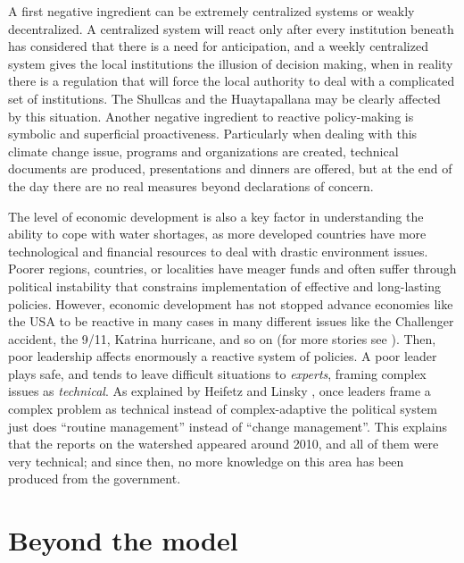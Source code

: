 \documentclass[doc,12pt,floatsintext]{apa7}
\begin{document}
A first negative ingredient can be extremely centralized systems or weakly decentralized. A centralized system will react only after every institution beneath has considered that there is a need for anticipation, and a weekly centralized system gives the local institutions the illusion of decision making, when in reality there is a regulation that will force the local authority to deal with a complicated set of institutions. The Shullcas and the Huaytapallana may be clearly affected by this situation. Another negative ingredient to reactive policy-making is symbolic and superficial proactiveness. Particularly when dealing with this climate change issue, programs and organizations are created, technical documents are produced, presentations and dinners are offered, but at the end of the day there are no real measures beyond declarations of concern.

The level of economic development is also a key factor in understanding the ability to cope with water shortages, as more developed countries have more technological and financial resources to deal with drastic environment issues. Poorer regions, countries, or localities have meager funds and often suffer through political instability that constrains implementation of effective and long-lasting policies. However, economic development has not stopped advance economies like the USA to be reactive in many cases in many different issues like the Challenger accident, the 9/11, Katrina hurricane, and so on (for more stories see \parencite{bazerman_predictable_2004}). Then, poor leadership affects enormously a reactive system of policies. A poor leader plays safe, and tends to leave difficult situations to \emph{experts}, framing complex issues as \emph{technical}. As explained by Heifetz and Linsky \parencite{heifetz_leadership_2002},
once leaders frame a complex problem as technical instead of complex-adaptive the political system just does ``routine management'' instead of ``change management''. This explains that the reports on the watershed appeared around 2010, and all of them were very technical; and since then, no more knowledge on this area has been produced from the government.



\section{Beyond the model}
\end{document}
